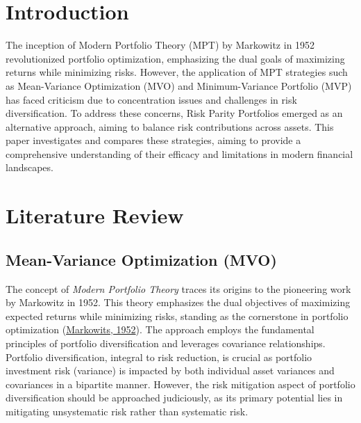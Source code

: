 \documentclass[12pt,preprint, authoryear]{elsarticle}
\numberwithin{equation}{section}
\numberwithin{figure}{section}
\numberwithin{table}{section}
\begin{document}
\pagestyle{fancy}
\chead{}
\rhead{}
\lfoot{}
\lhead{}
\cfoot{}


\headsep 35pt %




\newpage

\newpage

\hypertarget{introduction}{%
\section*{Introduction}\label{introduction}}

The inception of Modern Portfolio Theory (MPT) by Markowitz in 1952
revolutionized portfolio optimization, emphasizing the dual goals of
maximizing returns while minimizing risks. However, the application of
MPT strategies such as Mean-Variance Optimization (MVO) and
Minimum-Variance Portfolio (MVP) has faced criticism due to
concentration issues and challenges in risk diversification. To address
these concerns, Risk Parity Portfolios emerged as an alternative
approach, aiming to balance risk contributions across assets. This paper
investigates and compares these strategies, aiming to provide a
comprehensive understanding of their efficacy and limitations in modern
financial landscapes.

\hypertarget{literature-review}{%
\section{\texorpdfstring{Literature Review
\label{-}}{Literature Review }}\label{literature-review}}

\hypertarget{mean-variance-optimization-mvo}{%
\subsection{Mean-Variance Optimization
(MVO)}\label{mean-variance-optimization-mvo}}

The concept of \emph{Modern Portfolio Theory} traces its origins to the
pioneering work by Markowitz in 1952. This theory emphasizes the dual
objectives of maximizing expected returns while minimizing risks,
standing as the cornerstone in portfolio optimization
(\protect\hyperlink{ref-markowits1952portfolio}{Markowits, 1952}). The
approach employs the fundamental principles of portfolio diversification
and leverages covariance relationships. Portfolio diversification,
integral to risk reduction, is crucial as portfolio investment risk
(variance) is impacted by both individual asset variances and
covariances in a bipartite manner. However, the risk mitigation aspect
of portfolio diversification should be approached judiciously, as its
primary potential lies in mitigating unsystematic risk rather than
systematic risk.
\end{document}
